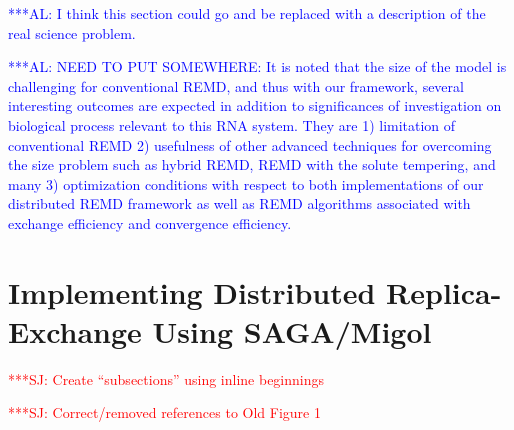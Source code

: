 \documentclass{rspublic}
\newcommand{\alnote}[1]{ {\textcolor{blue} { ***AL: #1 }}}
\newcommand{\jhanote}[1]{ {\textcolor{red} { ***SJ: #1 }}}
\newcommand{\alnote}[1]{}
\newcommand{\jhanote}[1]{}
\begin{document}


\alnote{I think this section could go and be replaced with a
  description of the real science problem.}  




\alnote{NEED TO PUT SOMEWHERE: It is noted that the size of the model
  is challenging for conventional REMD, and thus with our framework,
  several interesting outcomes are expected in addition to
  significances of investigation on biological process relevant to
  this RNA system. They are 1) limitation of conventional REMD 2)
  usefulness of other advanced techniques for overcoming the size
  problem such as hybrid REMD, REMD with the solute tempering, and
  many 3) optimization conditions with respect to both implementations
  of our distributed REMD framework as well as REMD algorithms
  associated with exchange efficiency and convergence efficiency.  }

\section{Implementing Distributed Replica-Exchange Using SAGA/Migol}
\label{sec:remd_impl}

\jhanote{Create ``subsections'' using inline beginnings}

\jhanote{Correct/removed references to Old Figure 1}
\end{document}
